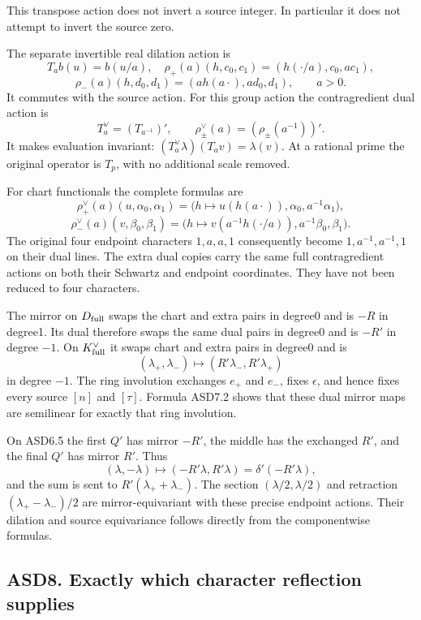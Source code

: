 This transpose action does not invert a source integer. In particular it
does not attempt to invert the source zero.

The separate invertible real dilation action is \[
 T_ab(u)=b(u/a),\quad
 \rho_+(a)(h,c_0,c_1)=(h(\cdot/a),c_0,ac_1),
\] \[
 \rho_-(a)(h,d_0,d_1)=(a h(a\cdot),ad_0,d_1),\qquad a>0.
 \tag{ASD7.3}
\] It commutes with the source action. For this group action the
contragredient dual action is \[
 T_a^\vee=(T_{a^{-1}})',\qquad
 \rho_\pm^\vee(a)=(\rho_\pm(a^{-1}))'.
 \tag{ASD7.4}
\] It makes evaluation invariant:
\((T_a^\vee\lambda)(T_av)=\lambda(v)\). At a rational prime the original
operator is \(T_p\), with no additional scale removed.

For chart functionals the complete formulas are \[
 \rho_+^\vee(a)(u,\alpha_0,\alpha_1)
 =\bigl(h\mapsto u(h(a\cdot)),\alpha_0,a^{-1}\alpha_1\bigr),
\] \[
 \rho_-^\vee(a)(v,\beta_0,\beta_1)
 =\bigl(h\mapsto v(a^{-1}h(\cdot/a)),a^{-1}\beta_0,\beta_1\bigr).
 \tag{ASD7.5}
\] The original four endpoint characters \(1,a,a,1\) consequently become
\(1,a^{-1},a^{-1},1\) on their dual lines. The extra dual copies carry
the same full contragredient actions on both their Schwartz and endpoint
coordinates. They have not been reduced to four characters.

The mirror on \(D_{\rm full}\) swaps the chart and extra pairs in
degree0 and is \(-R\) in degree1. Its dual therefore swaps the same dual
pairs in degree0 and is \(-R'\) in degree \(-1\). On
\(K_{\rm full}^\vee\) it swaps chart and extra pairs in degree0 and is
\[
 (\lambda_+,\lambda_-)\longmapsto(R'\lambda_-,R'\lambda_+)
 \tag{ASD7.6}
\] in degree \(-1\). The ring involution exchanges \(e_+\) and \(e_-\),
fixes \(\epsilon\), and hence fixes every source \([n]\) and \([\tau]\).
Formula ASD7.2 shows that these dual mirror maps are semilinear for
exactly that ring involution.

On ASD6.5 the first \(Q'\) has mirror \(-R'\), the middle has the
exchanged \(R'\), and the final \(Q'\) has mirror \(R'\). Thus \[
 (\lambda,-\lambda)\longmapsto(-R'\lambda,R'\lambda)
   =\delta'(-R'\lambda),
\] and the sum is sent to \(R'(\lambda_++\lambda_-)\). The section
\((\lambda/2,\lambda/2)\) and retraction \((\lambda_+-\lambda_-)/2\) are
mirror-equivariant with these precise endpoint actions. Their dilation
and source equivariance follows directly from the componentwise
formulas.

\subsection{ASD8. Exactly which character reflection
supplies}\label{asd8.-exactly-which-character-reflection-supplies}


